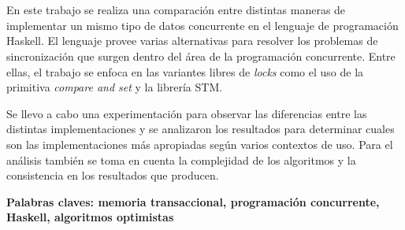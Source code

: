 \chapter*{\runtitulo}

\noindent
En este trabajo se realiza una comparación entre distintas maneras de implementar un mismo tipo de datos concurrente en el lenguaje de programación Haskell. El lenguaje provee varias alternativas para resolver los problemas de sincronización que surgen dentro del área de la programación concurrente. Entre ellas, el trabajo se enfoca en las variantes libres de \emph{locks} como el uso de la primitiva \emph{compare and set} y la librería STM.

Se llevo a cabo una experimentación para observar las diferencias entre las distintas implementaciones y se analizaron los resultados para determinar cuales son las implementaciones más apropiadas según varios contextos de uso. Para el análisis también se toma en cuenta la complejidad de los algoritmos y la consistencia en los resultados que producen.

\bigskip

\noindent\textbf{Palabras claves: memoria transaccional, programación concurrente, Haskell, algoritmos optimistas}